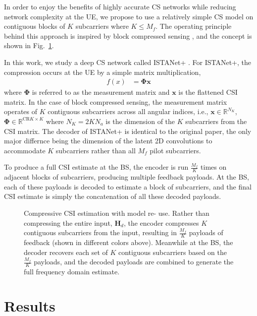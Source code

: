 In order to enjoy the benefits of highly accurate CS networks while
reducing network complexity at the UE, we propose to use a relatively simple CS
model on contiguous blocks of $K$ subcarriers where $K \leq M_f$.
The operating principle behind this approach is inspired by block 
compressed sensing \cite{ref:Gan2007blockCS}, and the concept is 
shown in Fig.~\ref{fig:model_reuse}.

In this work, we study a deep CS network called ISTANet+ \cite{ref:zhang2018ista}.
For ISTANet+, the compression occurs at the UE by a simple matrix multiplication, 
\begin{align}
    f(x) &= \mathbf{\Phi}\mathbf{x}
\end{align}
where $\mathbf{\Phi}$ is referred to as the measurement matrix and 
$\mathbf{x}$ is the flattened CSI matrix. In the case of block compressed
sensing, the measurement matrix operates of $K$ contiguous subcarriers across
all angular indices, i.e., $\mathbf{x} \in \mathbb{R}^{N_K}$, $\mathbf{\Phi} 
\in \mathbb{R}^{\text{CR} K  \times K}$ where $N_K = 2 K N_a$ is the dimension of
the $K$ subcarriers from the CSI matrix. The decoder of ISTANet+ is identical 
to the original paper, the only major differnce being the dimension of the latent
2D convolutions to accommodate $K$ subcarriers rather than all $M_f$ pilot subcarriers.

To produce a full CSI estimate at the BS, the encoder is run $\frac{M_f}{K}$ times
on adjacent blocks of subcarriers, producing multiple feedback payloads. At the BS, 
each of these payloads is decoded to estimate a block of subcarriers, and the final CSI
estimate is simply the concatenation of all these decoded payloads.

\begin{figure}
    \centering
    {
      \fontsize{8pt}{8pt}
      \def\svgwidth{1.0\linewidth}
      
    }
    \caption{Compressive CSI estimation with model re-
    use. Rather than compressing the entire input, $\mathbf{H}_d$,
    the encoder compresses $K$ contiguous subcarriers
    from the input, resulting in $\frac{M_f}{K}$ payloads of feedback
    (shown in different colors above). Meanwhile at the
    BS, the decoder recovers each set of $K$ contiguous
    subcarriers based on the $\frac{M_f}{K}$ payloads, and the
    decoded payloads are combined to generate the full
    frequency domain estimate.}
    \label{fig:model_reuse}
\end{figure}

\section{Results} \label{sect:direct_reuse_results}

